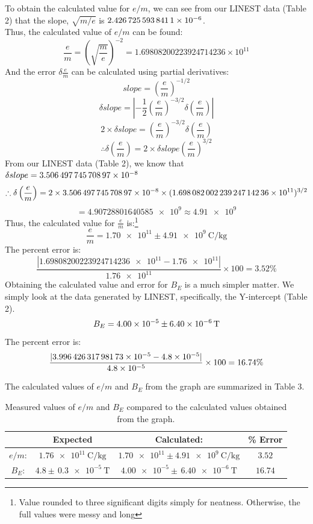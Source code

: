 \documentclass[letterpaper]{article}
\begin{document}
\noindent To obtain the calculated value for $e/m$, we can see from our LINEST data (Table 2) that the slope, $\sqrt{m/e}$ is
$\num{2.4267255938411E-06}$.\\
Thus, the calculated value of $e/m$ can be found:
$$ \frac{e}{m} = \left(\sqrt{\frac{m}{e}}\right)^{-2} = 1.69808200223924714236 \times 10^{11} $$
And the error $\delta \frac{e}{m}$ can be calculated using partial derivatives:
$$slope= \left(\frac{e}{m}\right)^{-1/2}$$
$$\delta slope = \left| -\frac{1}{2} \left(\frac{e}{m}\right)^{-3/2} \delta \left(\frac{e}{m}\right)\right|$$
$$ 2 \times \delta slope = \left(\frac{e}{m}\right)^{-3/2} \delta \left(\frac{e}{m}\right) $$
$$ \therefore \delta \left(\frac{e}{m}\right) = 2 \times \delta slope \left(\frac{e}{m}\right)^{3/2}$$
From our LINEST data (Table 2), we know that $\delta slope = \num{3.50649774570897E-08} $
$$ \therefore \delta \left(\frac{e}{m}\right) = 2 \times \num{3.50649774570897E-08} \times (\num{1.69808200223924714236e11})^{3/2}$$
$$= \num{4.90728801640585e9} \approx \num{4.91e9}$$
Thus, the calculated value for $\frac{e}{m}$ is:\footnote{Value rounded to three significant digits simply for neatness. Otherwise, the full values were messy and long}
$$\frac{e}{m}=\num{1.70e11} \pm \SI{4.91e9}{\coulomb\per\kilogram}$$
The percent error is:
$$ \frac{|\num{1.69808200223924714236e11}-\num{1.76e11}|}{\num{1.76e11}}\times100 = 3.52\%$$
Obtaining the calculated value and error for $B_E$ is a much simpler matter. We simply
look at the data generated by LINEST, specifically, the Y-intercept (Table 2).
$$B_E = \num{4.00E-05}\pm \SI{6.40E-06}{\tesla}$$
The percent error is:
$$ \frac{|\num{3.99642631798173E-05}-\num{4.8e-5}|}{\num{4.8e-5}}\times100 = 16.74\%$$

\vspace{1cm}
\noindent The calculated values of $e/m$ and $B_E$ from the graph are summarized in Table 3.
\begin{table}[H]
\centering
\begin{tabular}{c|c|c|c|}
                & Expected                      & Calculated:                                     & \% Error \\ \hline
$e/m$: & $\SI{1.76e11}{\coulomb\per\kilogram}$      & $\num{1.70e11} \pm \SI{4.91e9}{\coulomb\per\kilogram}$  &    $3.52$  \\ \hline
$B_E$: & $4.8 \pm \,\SI{0.3e-5}{\tesla}$           & $\num{4.00e-5} \pm \,\SI{6.40e-6}{\tesla}$                    &   $16.74$  \\ \hline
\end{tabular}
\caption{Measured values of $e/m$ and $B_E$ compared to the calculated values obtained from the graph.}
\end{table}
\end{document}

